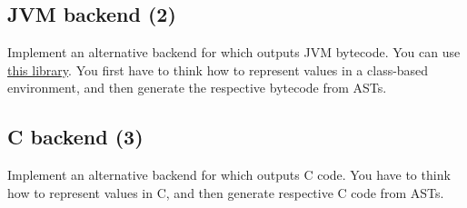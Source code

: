 \subsection{JVM backend (2)}
Implement an alternative backend for \langname which outputs JVM bytecode.
You can use \href{https://github.com/psuter/cafebabe}{this library}.
You first have to think how to represent \langname values in a class-based environment,
and then generate the respective bytecode from \langname ASTs.

\subsection{C backend (3)}
Implement an alternative backend for \langname which outputs C code.
You have to think how to represent \langname values in C,
and then generate respective C code from \langname ASTs.

